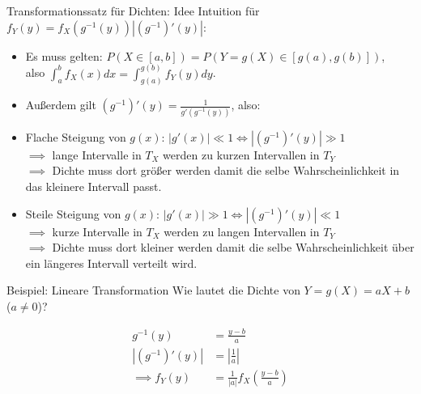 \documentclass[
  10pt,
  ignorenonframetext,
]{beamer}
\begin{document}
\begin{frame}{Transformationssatz für Dichten: Idee}
\protect\hypertarget{transformationssatz-fuxfcr-dichten-idee-3}{}
Intuition für
\(f_Y(y) = f_X\left(g^{-1}(y)\right) \left|\left(g^{-1}\right)'(y)\right|\):

\begin{itemize}
\item
  Es muss gelten:
  \(P\left(X \in [a, b]\right) = P\left(Y = g(X) \in \left[g(a), g(b)\right]\right)\),\\
  also \(\int^b_a f_X(x) dx = \int^{g(b)}_{g(a)} f_Y(y) dy\).
\item
  Außerdem gilt \(\left(g^{-1}\right)'(y) = \frac{1}{g'(g^{-1}(y))}\),
  also:
\item
  Flache Steigung von \(g(x)\):
  \(|g'(x)| \ll 1 \iff |\left(g^{-1}\right)'(y)| \gg 1\)\\
  \(\implies\) lange Intervalle in \(T_X\) werden zu kurzen Intervallen
  in \(T_Y\)\\
  \(\implies\) Dichte muss dort größer werden damit die selbe
  Wahrscheinlichkeit in das kleinere Intervall passt.
\item
  Steile Steigung von \(g(x)\):
  \(|g'(x)| \gg 1 \iff |\left(g^{-1}\right)'(y)| \ll 1\)\\
  \(\implies\) kurze Intervalle in \(T_X\) werden zu langen Intervallen
  in \(T_Y\)\\
  \(\implies\) Dichte muss dort kleiner werden damit die selbe
  Wahrscheinlichkeit über ein längeres Intervall verteilt wird.
\end{itemize}
\end{frame}

\begin{frame}{Beispiel: Lineare Transformation}
\protect\hypertarget{beispiel-lineare-transformation}{}
Wie lautet die Dichte von \(Y = g(X) = aX + b\) (\(a \neq 0\))?

\begin{align*}
g^{-1}(y) &= \tfrac{y-b}{a} \\
\left|\left(g^{-1}\right)'(y)\right| &= \left|\tfrac{1}{a}\right| \\
\implies f_Y(y) & =  \tfrac{1}{|a|} f_X\left(\tfrac{y-b}{a}\right)
\end{align*}
\end{frame}
\end{document}
